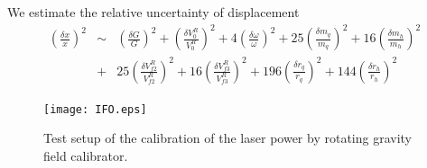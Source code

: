 \documentclass[12pt]{iopart}
\begin{document}
We estimate the  relative uncertainty of  displacement
\begin{eqnarray}
\left( \frac{\delta x}{x} \right)^2 &\sim& \left( \frac{\delta G}{G} \right)^2 +\left( \frac{\delta V^R_0}{V^R_0} \right)^2+4\left( \frac{\delta \omega}{\omega} \right)^2+ 25\left( \frac{\delta m_q}{m_q} \right)^2 +16\left( \frac{\delta m_h}{m_h} \right)^2 \\
&+&25\left( \frac{\delta V^R_{f2}}{V^R_{f2}} \right)^2+16\left( \frac{\delta V^R_{f3}}{V^R_{f3}} \right)^2+ 196\left( \frac{\delta r_q}{r_q} \right)^2 +144\left( \frac{\delta r_h}{r_h} \right)^2 
\end{eqnarray}
\begin{figure}
\begin{center}
\texttt{[image: IFO.eps]}
\caption{Test setup of the calibration of the laser power by rotating gravity field calibrator.}
\label{fig:IFO}
\end{center}
\end{figure}
\end{document}
